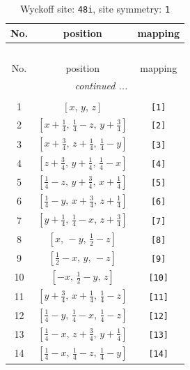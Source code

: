 \documentclass[fleqn,8pt]{jsarticle}
\begin{document}
\begin{longtable}{ccc}
\caption{Wyckoff site: {\tt 48i}, site symmetry: {\tt 1}}
 \\
 \hline \hline
No. & position & mapping \\ \hline \endfirsthead

\multicolumn{2}{l}{\tablename\ \thetable{}} \\
 \hline \hline
No. & position & mapping \\ \hline \endhead

 \hline \hline
\multicolumn{2}{r}{\footnotesize\it continued ...} \\ \endfoot

 \hline \hline
\multicolumn{2}{r}{} \\ \endlastfoot

1 & $\left[ x,\, y,\, z \right]$ & {\tt [1]} \\ \hline
2 & $\left[ x + \frac{1}{4},\, \frac{1}{4} - z,\, y + \frac{3}{4} \right]$ & {\tt [2]} \\ \hline
3 & $\left[ x + \frac{3}{4},\, z + \frac{1}{4},\, \frac{1}{4} - y \right]$ & {\tt [3]} \\ \hline
4 & $\left[ z + \frac{3}{4},\, y + \frac{1}{4},\, \frac{1}{4} - x \right]$ & {\tt [4]} \\ \hline
5 & $\left[ \frac{1}{4} - z,\, y + \frac{3}{4},\, x + \frac{1}{4} \right]$ & {\tt [5]} \\ \hline
6 & $\left[ \frac{1}{4} - y,\, x + \frac{3}{4},\, z + \frac{1}{4} \right]$ & {\tt [6]} \\ \hline
7 & $\left[ y + \frac{1}{4},\, \frac{1}{4} - x,\, z + \frac{3}{4} \right]$ & {\tt [7]} \\ \hline
8 & $\left[ x,\, - y,\, \frac{1}{2} - z \right]$ & {\tt [8]} \\ \hline
9 & $\left[ \frac{1}{2} - x,\, y,\, - z \right]$ & {\tt [9]} \\ \hline
10 & $\left[ - x,\, \frac{1}{2} - y,\, z \right]$ & {\tt [10]} \\ \hline
11 & $\left[ y + \frac{3}{4},\, x + \frac{1}{4},\, \frac{1}{4} - z \right]$ & {\tt [11]} \\ \hline
12 & $\left[ \frac{1}{4} - y,\, \frac{1}{4} - x,\, \frac{1}{4} - z \right]$ & {\tt [12]} \\ \hline
13 & $\left[ \frac{1}{4} - x,\, z + \frac{3}{4},\, y + \frac{1}{4} \right]$ & {\tt [13]} \\ \hline
14 & $\left[ \frac{1}{4} - x,\, \frac{1}{4} - z,\, \frac{1}{4} - y \right]$ & {\tt [14]} \\ \hline

\end{longtable}
\end{document}
